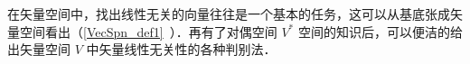 
在矢量空间中，找出线性无关的向量往往是一个基本的任务，这可以从基底张成矢量空间看出（\autoref{VecSpn_def1}~）．再有了对偶空间 $V^*$ 空间的知识后，可以便洁的给出矢量空间 $V$ 中矢量线性无关性的各种判别法．